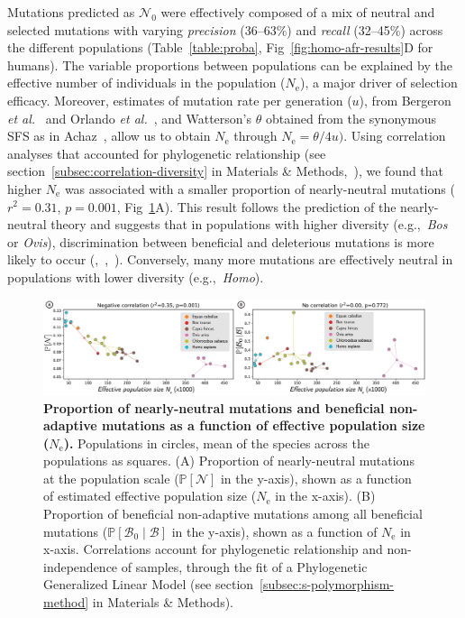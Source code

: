 \documentclass[10pt,letterpaper]{article}
\newcommand{\Ne}{N_{\text{e}}}
\newcommand{\proba}{\mathbb{P}}
\newcommand{\SphyNeu}{\mathcal{N}_0}
\newcommand{\SphyBen}{\mathcal{B}_0}
\newcommand{\given}{\mid}
\newcommand{\SpopNeu}{\mathcal{N}}
\newcommand{\SpopBen}{\mathcal{B}}
\begin{document}
Mutations predicted as $\SphyNeu$ were effectively composed of a mix of neutral and selected mutations with varying \textit{precision} (36--63\%) and \textit{recall} (32--45\%) across the different populations (Table~\ref{table:proba}, Fig~\ref{fig:homo-afr-results}D for humans).
The variable proportions between populations can be explained by the effective number of individuals in the population ($\Ne$), a major driver of selection efficacy.
Moreover, estimates of mutation rate per generation ($u$), from Bergeron \textit{et al.}~\cite{bergeron_evolution_2023} and Orlando \textit{et al.}~\cite{orlando_recalibrating_2013}, and Watterson’s $\theta$ obtained from the synonymous SFS as in Achaz~\cite{achaz_frequency_2009}, allow us to obtain $\Ne$ through $\Ne=\theta/4 u)$.
Using correlation analyses that accounted for phylogenetic relationship (see section~\ref{subsec:correlation-diversity} in Materials \& Methods,~), we found that higher $\Ne$ was associated with a smaller proportion of nearly-neutral mutations ($r^2=0.31$, $p=0.001$, Fig~\ref{fig:diversity}A).
This result follows the prediction of the nearly-neutral theory and suggests that in populations with higher diversity (e.g.,~\textit{Bos} or \textit{Ovis}), discrimination between beneficial and deleterious mutations is more likely to occur (,~,~).
Conversely, many more mutations are effectively neutral in populations with lower diversity (e.g.,~\textit{Homo}).

\begin{figure}[!ht]
\begin{adjustwidth}{-2.25in}{0in} %
\centering
\includegraphics[width=1.4\textwidth, page=1] {figure4.eps}
\caption{
{\bf Proportion of nearly-neutral mutations and beneficial non-adaptive mutations as a function of effective population size ($\Ne$).}
Populations in circles, mean of the species across the populations as squares.
(A) Proportion of nearly-neutral mutations at the population scale ($\proba [ \SpopNeu]$ in the y-axis), shown as a function of estimated effective population size ($\Ne$ in the x-axis).
(B) Proportion of beneficial non-adaptive mutations among all beneficial mutations ($\proba [ \SphyBen \given \SpopBen]$ in the y-axis), shown as a function of $\Ne$ in x-axis.
Correlations account for phylogenetic relationship and non-independence of samples, through the fit of a Phylogenetic Generalized Linear Model (see section~\ref{subsec:s-polymorphism-method} in Materials \& Methods).
}
\label{fig:diversity}
\end{adjustwidth}
\end{figure}
\end{document}
